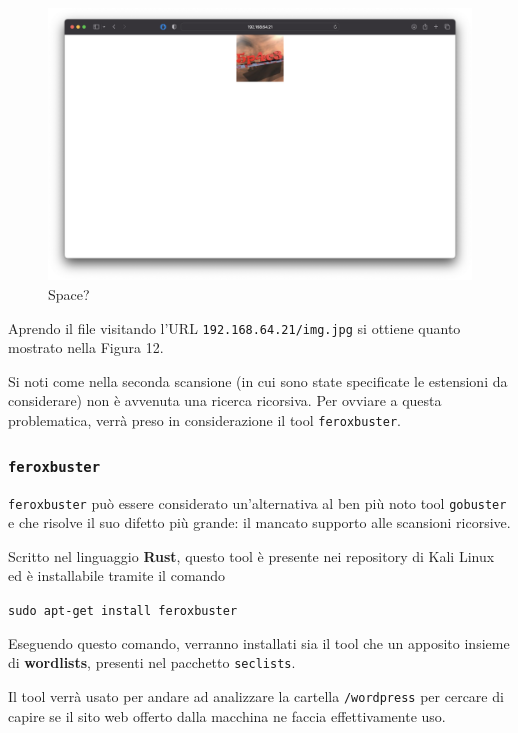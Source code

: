 \documentclass[a4paper, 12pt, oneside]{article}
\begin{document}
\begin{figure}[h!]
    \centering
    \includegraphics[width=\textwidth]{img/space.png}
    \caption{Space?}
\end{figure}

Aprendo il file visitando l'URL \texttt{192.168.64.21/img.jpg} si ottiene quanto mostrato nella Figura 12.

Si noti come nella seconda scansione (in cui sono state specificate le estensioni da considerare) non è avvenuta una ricerca ricorsiva. Per ovviare a questa problematica, verrà preso in considerazione il tool \texttt{feroxbuster}.

\subsubsection{\texttt{feroxbuster}}

\texttt{feroxbuster} può essere considerato un'alternativa al ben più noto tool \texttt{gobuster} e che risolve il suo difetto più grande: il mancato supporto alle scansioni ricorsive. \cite{feroxbuster}

Scritto nel linguaggio \textbf{Rust}, questo tool è presente nei repository di Kali Linux ed è installabile tramite il comando

\begin{center}
    \texttt{sudo apt-get install feroxbuster}
\end{center}

Eseguendo questo comando, verranno installati sia il tool che un apposito insieme di \textbf{wordlists}, presenti nel pacchetto \texttt{seclists}.

Il tool verrà usato per andare ad analizzare la cartella \texttt{/wordpress} per cercare di capire se il sito web offerto dalla macchina ne faccia effettivamente uso.
\end{document}
